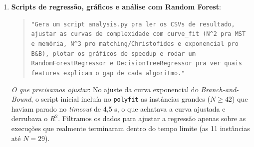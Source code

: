 \documentclass[12pt]{article}
\begin{document}
\begin{enumerate}
  \item \textbf{Scripts de regressão, gráficos e análise com Random Forest}:
  \begin{quote}
  \small\texttt{"Gera um script analysis.py pra ler os CSVs de resultado, ajustar as curvas de complexidade com curve\_fit (N\textasciicircum{}2 pra MST e memória, N\textasciicircum{}3 pro matching/Christofides e exponencial pro B\&B), plotar os gráficos de speedup e rodar um RandomForestRegressor e DecisionTreeRegressor pra ver quais features explicam o gap de cada algoritmo."}
  \end{quote}
  \textit{O que precisamos ajustar}: No ajuste da curva exponencial do \textit{Branch-and-Bound}, o script inicial incluía no \texttt{polyfit} as instâncias grandes ($N \ge 42$) que haviam parado no \textit{timeout} de 4,5 s, o que achatava a curva ajustada e derrubava o $R^2$. Filtramos os dados para ajustar a regressão apenas sobre as execuções que realmente terminaram dentro do tempo limite (as 11 instâncias até $N=29$).
\end{enumerate}
\end{document}
